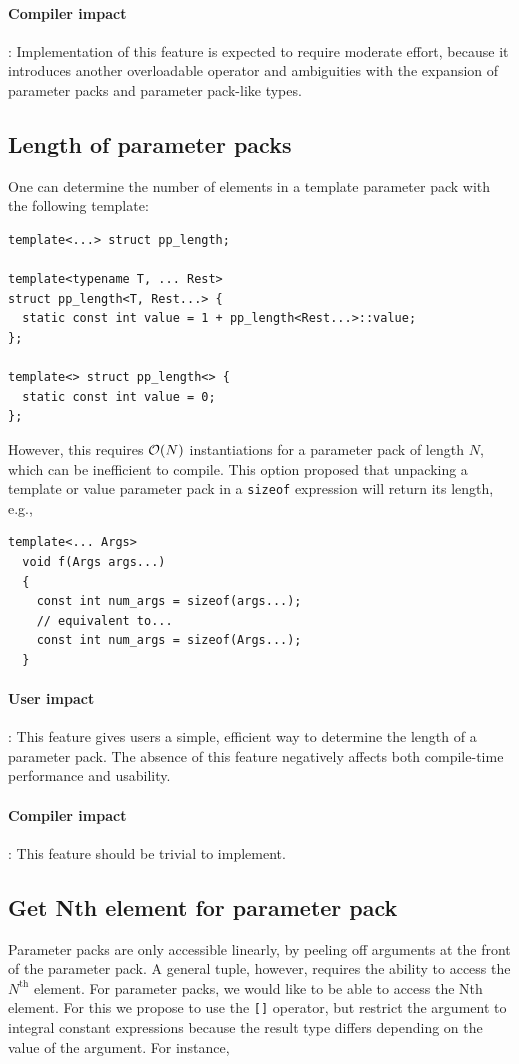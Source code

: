 \documentclass{article}
\begin{document}
\paragraph{Compiler impact}: Implementation of this feature is expected to
require moderate effort, because it introduces another overloadable
operator and ambiguities with the expansion of parameter packs and
parameter pack-like types.

\subsection{Length of parameter packs}
\label{sec:pp-size}
One can determine the number of elements in a template parameter pack
with the following template:
\begin{verbatim}
template<...> struct pp_length;

template<typename T, ... Rest>
struct pp_length<T, Rest...> {
  static const int value = 1 + pp_length<Rest...>::value; 
};

template<> struct pp_length<> {
  static const int value = 0;
};
\end{verbatim}

However, this requires ${\cal O}(N)$ instantiations for a parameter
pack of length $N$, which can be inefficient to compile. This option
proposed that unpacking a template or value parameter pack in a
\texttt{sizeof} expression will return its length, e.g.,

\begin{verbatim}
template<... Args>
  void f(Args args...)
  {
    const int num_args = sizeof(args...);
    // equivalent to...
    const int num_args = sizeof(Args...);
  }
\end{verbatim}

\paragraph{User impact}: This feature gives users a simple, efficient
way to determine the length of a parameter pack. The absence of this
feature negatively affects both compile-time performance and usability.

\paragraph{Compiler impact}: This feature should be trivial to implement.

\subsection{Get Nth element for parameter pack}
Parameter packs are only accessible linearly, by peeling off arguments
at the front of the parameter pack. A general tuple, however, requires
the ability to access the $N^{\text{th}}$ element. For parameter
packs, we would like to be able to access the Nth element. For this we
propose to use the \texttt{[]} operator, but restrict the argument to
integral constant expressions because the result type differs
depending on the value of the argument. For instance,
\end{document}
